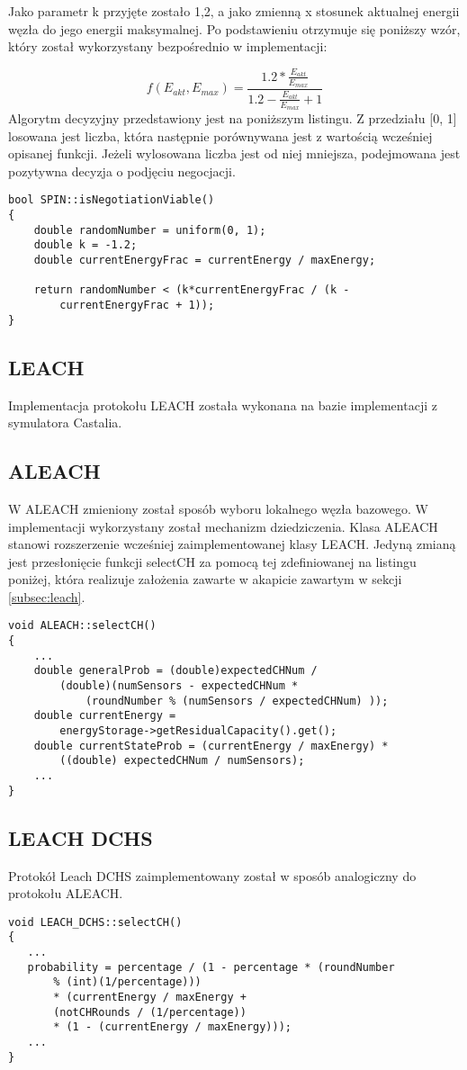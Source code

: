 Jako parametr k przyjęte zostało 1,2, a jako zmienną x stosunek aktualnej energii węzła do jego energii maksymalnej. Po podstawieniu otrzymuje się poniższy wzór, który został wykorzystany bezpośrednio w implementacji: 

\[
	f(E_{akt}, E_{max}) = \frac{1.2 * \frac{E_{akt}}{E_{max}}}{1.2 - \frac{E_{akt}}{E_{max}} + 1}
\]
Algorytm decyzyjny przedstawiony jest na poniższym listingu. Z przedziału [0, 1] losowana jest liczba, która następnie porównywana jest z wartością wcześniej opisanej funkcji. Jeżeli wylosowana liczba jest od niej mniejsza, podejmowana jest pozytywna decyzja o podjęciu negocjacji.
\begin{verbatim}
bool SPIN::isNegotiationViable()
{
    double randomNumber = uniform(0, 1);
    double k = -1.2;
    double currentEnergyFrac = currentEnergy / maxEnergy;

    return randomNumber < (k*currentEnergyFrac / (k -
        currentEnergyFrac + 1));
}
\end{verbatim}
\subsection{LEACH}
Implementacja protokołu LEACH została wykonana na bazie implementacji z symulatora Castalia.
\subsection{ALEACH}
W ALEACH zmieniony został sposób wyboru lokalnego węzła bazowego. W implementacji wykorzystany został mechanizm dziedziczenia. Klasa ALEACH stanowi rozszerzenie wcześniej zaimplementowanej klasy LEACH. Jedyną zmianą jest przesłonięcie funkcji selectCH za pomocą tej zdefiniowanej na listingu poniżej, która realizuje założenia zawarte w akapicie  zawartym w sekcji \ref{subsec:leach}.
\begin{verbatim}
void ALEACH::selectCH()
{
    ...
    double generalProb = (double)expectedCHNum / 
        (double)(numSensors - expectedCHNum * 
            (roundNumber % (numSensors / expectedCHNum) ));
    double currentEnergy = 
        energyStorage->getResidualCapacity().get();
    double currentStateProb = (currentEnergy / maxEnergy) *
        ((double) expectedCHNum / numSensors);
    ...
}
\end{verbatim}
\subsection{LEACH DCHS}
Protokół Leach DCHS zaimplementowany został w sposób analogiczny do protokołu ALEACH.
\begin{verbatim}
void LEACH_DCHS::selectCH()
{
   ...
   probability = percentage / (1 - percentage * (roundNumber
       % (int)(1/percentage)))
       * (currentEnergy / maxEnergy +
       (notCHRounds / (1/percentage))
       * (1 - (currentEnergy / maxEnergy)));
   ...
}
\end{verbatim}
